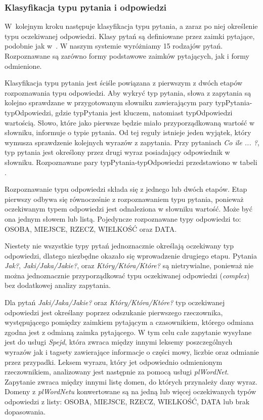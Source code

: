 \subsubsection{Klasyfikacja typu pytania i odpowiedzi}
W~kolejnym kroku następuje klasyfikacja typu pytania, a zaraz po niej określenie typu oczekiwanej odpowiedzi. Klasy pytań są definiowane przez zaimki pytające, podobnie jak w~\cite{gupta2012survey}. W naszym systemie wyróżniamy 15 rodzajów pytań. Rozpoznawane są zarówno formy podstawowe zaimków pytających, jak i formy odmienione.

Klasyfikacja typu pytania jest ściśle powiązana z pierwszym z dwóch etapów rozpoznawania typu odpowiedzi. Aby wykryć typ pytania, słowa z zapytania są kolejno sprawdzane w przygotowanym słowniku zawierającym pary typPytania-typOdpowiedzi, gdzie typPytania jest kluczem, natomiast typOdpowiedzi wartością. Słowo, które jako pierwsze będzie miało przyporządkowaną wartość w słowniku, informuje o typie pytania. Od tej reguły istnieje jeden wyjątek, który wymusza sprawdzenie kolejnych wyrazów z zapytania. Przy pytaniach \emph{Co ile ... ?}, typ pytania jest określony przez drugi wyraz posiadający odpowiednik w słowniku. Rozpoznawane pary typPytania-typOdpowiedzi przedstawiono w tabeli .

Rozpoznawanie typu odpowiedzi składa się z jednego lub dwóch etapów. Etap pierwszy odbywa się równocześnie z rozpoznawaniem typu pytania, ponieważ oczekiwanym typem odpowiedzi jest odnaleziona w słowniku wartość. Może być ona jednym słowem lub listą. Pojedyncze rozpoznawane typy odpowiedzi to: OSOBA, MIEJSCE, RZECZ, WIELKOŚĆ oraz DATA. 

Niestety nie wszystkie typy pytań jednoznacznie określają oczekiwany typ odpowiedzi, dlatego niezbędne okazało się wprowadzenie drugiego etapu. Pytania \emph{Jak?}, \emph{Jaki/Jaka/Jakie?}, oraz \emph{Który/Która/Które?} są nietrywialne, ponieważ nie można jednoznacznie przyporządkować typu oczekiwanej odpowiedzi (\emph{complex}) bez dodatkowej analizy zapytania. 

Dla pytań \emph{Jaki/Jaka/Jakie?} oraz \emph{Który/Która/Które?} typ oczekiwanej odpowiedzi jest określany poprzez odszukanie pierwszego rzeczownika, występującego pomiędzy zaimkiem pytającym a czasownikiem, którego odmiana zgodna jest z odmianą zaimka pytającego. W tym celu całe zapytanie wysyłane jest do usługi \emph{Spejd}, która zwraca między innymi leksemy poszczególnych wyrazów jak i tagsety zawierające informacje o części mowy, liczbie oraz odmianie przez przypadki. Leksem wyrazu, który jet odpowiednio odmienionym rzeczownikiem, analizowany jest następnie za pomocą usługi \emph{plWordNet}. Zapytanie zwraca między innymi listę domen, do których przynależy dany wyraz. Domeny z \emph{plWordNetu} konwertowane są na jedną lub więcej oczekiwanych typów odpowiedzi z listy: OSOBA, MIEJSCE, RZECZ, WIELKOŚĆ, DATA lub brak dopasowania. 


